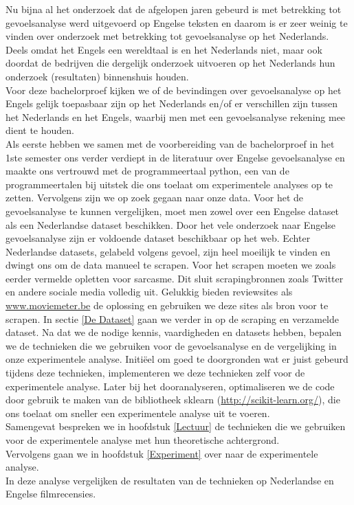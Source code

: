 Nu bijna al het onderzoek dat de afgelopen jaren gebeurd is met betrekking tot gevoelsanalyse werd uitgevoerd op Engelse teksten en daarom is er zeer weinig te vinden over onderzoek met betrekking tot gevoelsanalyse op het Nederlands. Deels omdat het Engels een wereldtaal is en het Nederlands niet, maar ook doordat de bedrijven die dergelijk onderzoek uitvoeren op het Nederlands hun onderzoek (resultaten) binnenshuis houden.
\\
Voor deze bachelorproef kijken we of de bevindingen over gevoelsanalyse op het Engels gelijk toepasbaar zijn op het Nederlands en/of er verschillen zijn tussen het Nederlands en het Engels, waarbij men met een gevoelsanalyse rekening mee dient te houden.\\
Als eerste hebben we samen met de voorbereiding van de bachelorproef in het 1ste semester ons verder verdiept in de literatuur over Engelse gevoelsanalyse en maakte ons vertrouwd met de programmeertaal python, een van de programmeertalen bij uitstek die ons toelaat om experimentele analyses op te zetten. Vervolgens zijn we op zoek gegaan naar onze data. Voor het de gevoelsanalyse te kunnen vergelijken, moet men zowel over een Engelse dataset als een Nederlandse dataset beschikken. Door het vele onderzoek naar Engelse gevoelsanalyse zijn er voldoende dataset beschikbaar op het web. Echter Nederlandse datasets, gelabeld volgens gevoel, zijn heel moeilijk te vinden en dwingt ons om de data manueel te scrapen. Voor het scrapen moeten we zoals eerder vermelde opletten voor sarcasme. Dit sluit scrapingbronnen zoals Twitter en andere sociale media volledig uit. Gelukkig bieden reviewsites als \url{www.moviemeter.be} de oplossing en gebruiken we deze sites als bron voor te scrapen. In sectie \ref{De Dataset} gaan we verder in op de scraping en verzamelde dataset. Na dat we de nodige kennis, vaardigheden en datasets hebben, bepalen we de technieken die we gebruiken voor de gevoelsanalyse en de vergelijking in onze experimentele analyse. Initi\"eel om goed te doorgronden wat er juist gebeurd tijdens deze technieken, implementeren we deze technieken zelf voor de experimentele analyse. Later bij het dooranalyseren, optimaliseren we de code door gebruik te maken van de bibliotheek sklearn (\url{http://scikit-learn.org/}), die ons toelaat om sneller een experimentele analyse uit te voeren.\\   
%
Samengevat bespreken we in hoofdstuk \ref{Lectuur} de technieken die we gebruiken voor de experimentele analyse met hun theoretische achtergrond. \\Vervolgens gaan we in hoofdstuk \ref{Experiment} over naar de experimentele analyse.\\ In deze analyse vergelijken de resultaten van de technieken op Nederlandse en Engelse filmrecensies.\\
